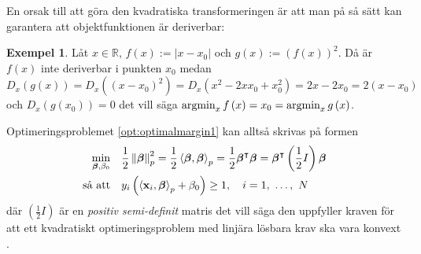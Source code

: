 \documentclass[a4paper, 12pt]{report}
\theoremstyle{definition}
\newtheorem{ex}{Exempel}[section]
\theoremstyle{remark}
\newcommand{\bfbeta}{{\boldsymbol{\beta}}}
\newcommand{\bfx}{\mathbf{x}}
\newcommand{\llangle}{\left\langle}
\newcommand{\rrangle}{\right\rangle}
\newcommand{\inner}[2]{\llangle #1, #2 \rrangle}
\begin{document}
En orsak till att göra den kvadratiska transformeringen är att man på så sätt kan garantera att objektfunktionen är deriverbar:
\begin{ex}
	Låt $x\in\mathbb{R}$, $f\left(x\right):=|x-x_0|$ och $g\left(x\right):=\left(f\left(x\right)\right)^2$. Då är $f\left(x\right)$ inte deriverbar i punkten $x_0$ medan $D_x\left(g\left(x\right)\right)=D_x\left(\left(x-x_0\right)^2\right)=D_x\left(x^2-2xx_0+x_0^2\right)=2x-2x_0=2\left(x-x_0\right)$ och $D_x\left(g\left(x_0\right)\right)=0$ det vill säga $\operatornamewithlimits{argmin}_x f\left(x\right) = x_0 = \operatornamewithlimits{argmin}_x g\left(x\right)$.
\end{ex}
Optimeringsproblemet \ref{opt:optimalmargin1} kan alltså skrivas på formen 
\begin{equation*}
\begin{aligned}
\operatornamewithlimits{min}_{\bfbeta, \beta_0} & & &\frac{1}{2}\left\|\bfbeta
\right\|_p^2=\frac{1}{2}\inner{\bfbeta}{\bfbeta}_p=\frac{1}{2}\bfbeta^\intercal\bfbeta=\bfbeta^\intercal\left(\frac{1}{2}I\right)\bfbeta\\
\text{så att} & & &y_i\left(\inner{\bfx_i}{\bfbeta}_p+\beta_0\right)\geq 1,\quad i=1,~\dots,~N
\end{aligned}
\end{equation*}
där $\left( \frac{1}{2}I \right)$ är en \emph{positiv semi-definit} matris det vill säga den uppfyller kraven för att ett kvadratiskt optimeringsproblem med linjära lösbara krav ska vara konvext \cite{Boyd}.
\end{document}
